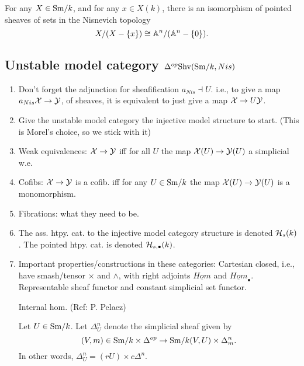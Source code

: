 \documentclass{amsart}%
\begin{document}
\begin{proposition}\cite[2.4.1]{Mor04}
  For any $X \in \mathrm{Sm}/k$, and for any $x \in X(k)$, there is an
  isomorphism of pointed sheaves of sets in the Nisnevich topology
  \begin{equation*}
    X/(X-\{x\}) \cong \mathbb{A}^n / (\mathbb{A}^n - \{0\}).
  \end{equation*}
\end{proposition}

\subsection{Unstable model category $\Delta^{op} \mathrm{Shv}(\mathrm{Sm}/k,Nis)$}
\begin{enumerate}
    \item Don't forget the adjunction for sheafification
  $a_{Nis} \dashv U$. i.e., to give a map $a_{Nis}\mathcal{X} \to \mathcal{Y}$, of
  sheaves, it is equivalent to just give a map $\mathcal{X} \to U\mathcal{Y}$.

    \item Give the unstable model category the injective model
  structure to start. (This is Morel's choice, so we stick with it)

    \item Weak equivalences: $\mathcal{X} \to \mathcal{Y}$ iff for all $U$ the map
  $\mathcal{X}(U)\to \mathcal{Y}(U)$ a simplicial w.e.

    \item Cofibs: $\mathcal{X} \to \mathcal{Y}$ is a cofib. iff for any
  $U\in \mathrm{Sm}/k$ the map $\mathcal{X}(U) \to \mathcal{Y}(U)$ is a monomorphism.

    \item Fibrations: what they need to be. 

    \item The ass. htpy. cat. to the injective model category
  structure is denoted $\mathcal{H}_s(k)$. The pointed htpy. cat. is denoted
  $\mathcal{H}_{s,\bullet}(k)$.

    \item Important properties/constructions in these categories:
  Cartesian closed, i.e., have smash/tensor $\times$ and $\wedge$,
  with right adjoints $\underline{Hom}$ and
  $\underline{Hom}_{\bullet}$. Representable sheaf functor and
  constant simplicial set functor.

\begin{definition}
  Internal hom. (Ref: P. Pelaez)
  
  Let $U\in \mathrm{Sm}/k$. Let $\Delta^n_U$ denote the simplicial sheaf given by 
  \begin{equation*}
    (V,m) \in \mathrm{Sm}/k \times \Delta^{op} \to \mathrm{Sm}/k(V,U) \times \Delta^n_m.
  \end{equation*}
  In other words, $\Delta^n_U = (rU) \times c\Delta^n$. 


\end{definition}
\end{enumerate}
\end{document}
